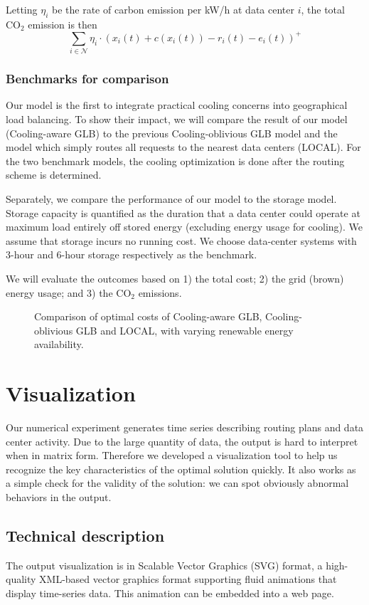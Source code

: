 \documentclass{acm_proc_article-sp}
\newcommand{\carbondioxide}{\ensuremath{\mathrm{CO}_2}}
\begin{document}
Letting $\eta_i$ be the rate of carbon emission per kW/h at data center $i$, the total \carbondioxide{} emission is then
\[\sum_{i \in \mathcal{N}} \eta_i \cdot (x_i(t) + c(x_i(t)) - r_i(t) - e_i(t))^+\]
\subsubsection{Benchmarks for comparison}
Our model is the first to integrate practical cooling concerns into geographical load balancing. To show their impact, we will compare the result of our model (Cooling-aware GLB) to the previous Cooling-oblivious GLB model and the model which simply routes all requests to the nearest data centers (LOCAL). For the two benchmark models, the cooling optimization is done after the routing scheme is determined.

Separately, we compare the performance of our model to the storage model. Storage capacity is quantified as the duration that a data center could operate at maximum load entirely off stored energy (excluding energy usage for cooling). We assume that storage incurs no running cost. We choose data-center systems with 3-hour and 6-hour storage respectively as the benchmark.

We will evaluate the outcomes based on 1) the total cost; 2) the grid (brown) energy usage; and 3) the \carbondioxide{} emissions.

\begin{figure*}
\centering
{}
\caption{Comparison of optimal costs of Cooling-aware GLB, Cooling-oblivious GLB and LOCAL, with varying renewable energy availability.}
\end{figure*}
\section{Visualization}
Our numerical experiment generates time series describing routing plans and data center activity. Due to the large quantity of data, the output is hard to interpret when in matrix form. Therefore we developed a visualization tool to help us recognize the key characteristics of the optimal solution quickly. It also works as a simple check for the validity of the solution: we can spot obviously abnormal behaviors in the output.

\subsection{Technical description}
The output visualization is in Scalable Vector Graphics (SVG) format, a high-quality XML-based vector graphics format supporting fluid animations that display time-series data. This animation can be embedded into a web page.
\end{document}
